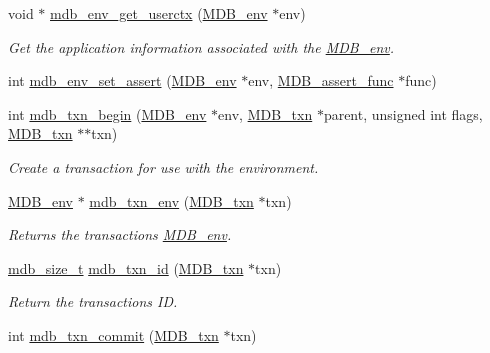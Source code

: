\begin{DoxyCompactItemize}
void $\ast$ \mbox{\hyperlink{group__mdb_ga45df6a4fb150cda2316b5ae224ba52f1}{mdb\+\_\+env\+\_\+get\+\_\+userctx}} (\mbox{\hyperlink{struct_m_d_b__env}{M\+D\+B\+\_\+env}} $\ast$env)
\begin{DoxyCompactList}\small\item\em Get the application information associated with the \mbox{\hyperlink{struct_m_d_b__env}{M\+D\+B\+\_\+env}}. \end{DoxyCompactList}\item 
int \mbox{\hyperlink{group__mdb_ga6df57850b14a8b3f237ea4dc012a4e0b}{mdb\+\_\+env\+\_\+set\+\_\+assert}} (\mbox{\hyperlink{struct_m_d_b__env}{M\+D\+B\+\_\+env}} $\ast$env, \mbox{\hyperlink{group__mdb_ga949ada362b3e84ec0435197056d82371}{M\+D\+B\+\_\+assert\+\_\+func}} $\ast$func)
\item 
int \mbox{\hyperlink{group__mdb_gad7ea55da06b77513609efebd44b26920}{mdb\+\_\+txn\+\_\+begin}} (\mbox{\hyperlink{struct_m_d_b__env}{M\+D\+B\+\_\+env}} $\ast$env, \mbox{\hyperlink{struct_m_d_b__txn}{M\+D\+B\+\_\+txn}} $\ast$parent, unsigned int flags, \mbox{\hyperlink{struct_m_d_b__txn}{M\+D\+B\+\_\+txn}} $\ast$$\ast$txn)
\begin{DoxyCompactList}\small\item\em Create a transaction for use with the environment. \end{DoxyCompactList}\item 
\mbox{\hyperlink{struct_m_d_b__env}{M\+D\+B\+\_\+env}} $\ast$ \mbox{\hyperlink{group__mdb_gaeb17735b8aaa2938a78a45cab85c06a0}{mdb\+\_\+txn\+\_\+env}} (\mbox{\hyperlink{struct_m_d_b__txn}{M\+D\+B\+\_\+txn}} $\ast$txn)
\begin{DoxyCompactList}\small\item\em Returns the transaction\textquotesingle{}s \mbox{\hyperlink{struct_m_d_b__env}{M\+D\+B\+\_\+env}}. \end{DoxyCompactList}\item 
\mbox{\hyperlink{lmdb_8h_a78821971e612e3898ef4b3ae45ed86f1}{mdb\+\_\+size\+\_\+t}} \mbox{\hyperlink{group__mdb_ga7b057cd5215b52b5bfa85d30699d3c8d}{mdb\+\_\+txn\+\_\+id}} (\mbox{\hyperlink{struct_m_d_b__txn}{M\+D\+B\+\_\+txn}} $\ast$txn)
\begin{DoxyCompactList}\small\item\em Return the transaction\textquotesingle{}s ID. \end{DoxyCompactList}\item 
int \mbox{\hyperlink{group__mdb_ga846fbd6f46105617ac9f4d76476f6597}{mdb\+\_\+txn\+\_\+commit}} (\mbox{\hyperlink{struct_m_d_b__txn}{M\+D\+B\+\_\+txn}} $\ast$txn)
$$
\end{DoxyCompactItemize}
